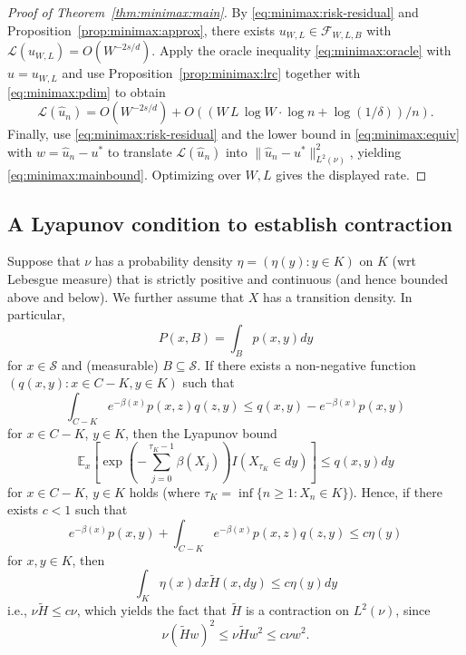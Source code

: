 \documentclass[pdflatex,sn-mathphys-ay]{sn-jnl}%
\numberwithin{equation}{section}
\newcommand\prs[1]{\left(#1\right)}
\newcommand\sbk[1]{\left[#1\right]}
\newcommand{\E}{\mathbb{E}}
\newcommand{\Scal}{\mathcal{S}}
\theoremstyle{thmstyleone}%
\theoremstyle{thmstyletwo}%
\theoremstyle{thmstylethree}%
\begin{document}

\begin{proof}[Proof of Theorem~\ref{thm:minimax:main}]
By \eqref{eq:minimax:risk-residual} and Proposition~\ref{prop:minimax:approx}, there exists \(u_{W,L}\in\mathcal{F}_{W,L,B}\) with \(\mathcal{L}(u_{W,L}) = O(W^{-2s/d})\).  Apply the oracle inequality \eqref{eq:minimax:oracle} with \(u=u_{W,L}\) and use Proposition~\ref{prop:minimax:lrc} together with \eqref{eq:minimax:pdim} to obtain
\begin{equation*}
\mathcal{L}(\hat u_n) = O(W^{-2s/d})+O((W\,L\,\log W\cdot \log n+\log(1/\delta))/n).
\end{equation*}
Finally, use \eqref{eq:minimax:risk-residual} and the lower bound in \eqref{eq:minimax:equiv} with \(w=\hat u_n-u^*\) to translate \(\mathcal{L}(\hat u_n)\) into \(\|\hat u_n-u^*\|_{L^2(\nu)}^2\), yielding \eqref{eq:minimax:mainbound}.  Optimizing over \(W,L\) gives the displayed rate.
\end{proof}

\subsection{A Lyapunov condition to establish contraction}
Suppose that $\nu$ has a probability density $\eta=(\eta(y):y\in K)$ on $K$ (wrt Lebesgue measure) that is strictly positive and continuous (and hence bounded above and below). We further assume that $X$ has a transition density. In particular,  
\[
P(x,B)=\int_B p(x,y)dy
\]
for $x\in\Scal$ and (measurable) $B\subseteq \Scal$. If there exists a non-negative function $(q(x,y):x\in C-K,y\in K)$ such that
\[
\int_{C-K}e^{-\beta(x)}p(x,z)q(z,y)\leq q(x,y)-e^{-\beta(x)}p(x,y)
\]
for $x\in C-K$, $y\in K$, then the Lyapunov bound
\[
\E_x\sbk{\exp\prs{-\sum_{j=0}^{\tau_K-1}\beta(X_j)}I(X_{\tau_K}\in dy)}\leq q(x,y)dy
\]
for $x\in C-K$, $y\in K$ holds (where $\tau_K=\inf\{n\geq1:X_n\in K\}$). Hence, if there exists $c<1$ such that 
\[
e^{-\beta(x)}p(x,y)+\int_{C-K}e^{-\beta(x)}p(x,z)q(z,y)\leq c\eta(y)
\]
for $x,y\in K$, then
\[
\int_K\eta(x)dx\tilde{H}(x,dy)\leq c\eta(y)dy
\]
i.e., $\nu\tilde{H}\leq c\nu$, which yields the fact that $\tilde{H}$ is a contraction on $L^2(\nu)$, since
\[
\nu(\tilde{H}w)^2\leq \nu\tilde{H}w^2\leq c\nu w^2.
\]
\end{document}
